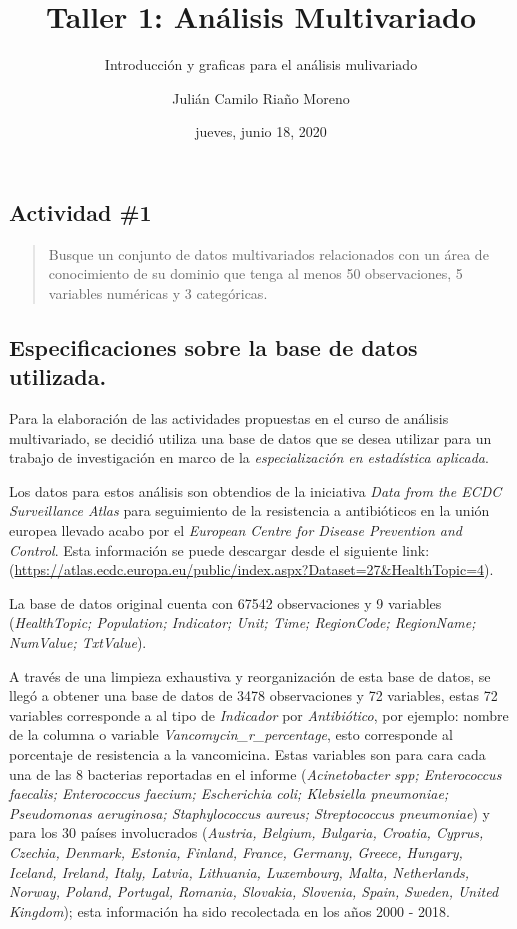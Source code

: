 \documentclass[
]{article}
\title{Taller 1: Análisis Multivariado}
\subtitle{Introducción y graficas para el análisis mulivariado}
\author{Julián Camilo Riaño Moreno}
\date{jueves, junio 18, 2020}
\begin{document}
\maketitle

{
\setcounter{tocdepth}{3}
\tableofcontents
}
\hypertarget{actividad-1}{%
\subsection{Actividad \#1}\label{actividad-1}}

\begin{quote}
Busque un conjunto de datos multivariados relacionados con un área de
conocimiento de su dominio que tenga al menos 50 observaciones, 5
variables numéricas y 3 categóricas.
\end{quote}

\hypertarget{especificaciones-sobre-la-base-de-datos-utilizada.}{%
\subsection{Especificaciones sobre la base de datos
utilizada.}\label{especificaciones-sobre-la-base-de-datos-utilizada.}}

Para la elaboración de las actividades propuestas en el curso de
análisis multivariado, se decidió utiliza una base de datos que se desea
utilizar para un trabajo de investigación en marco de la
\emph{especialización en estadística aplicada}.

Los datos para estos análisis son obtendios de la iniciativa \emph{Data
from the ECDC Surveillance Atlas} para seguimiento de la resistencia a
antibióticos en la unión europea llevado acabo por el \emph{European
Centre for Disease Prevention and Control}. Esta información se puede
descargar desde el siguiente link:
(\url{https://atlas.ecdc.europa.eu/public/index.aspx?Dataset=27\&HealthTopic=4}).

La base de datos original cuenta con 67542 observaciones y 9 variables
(\emph{HealthTopic; Population; Indicator; Unit; Time; RegionCode;
RegionName; NumValue; TxtValue}).

A través de una limpieza exhaustiva y reorganización de esta base de
datos, se llegó a obtener una base de datos de 3478 observaciones y 72
variables, estas 72 variables corresponde a al tipo de \emph{Indicador}
por \emph{Antibiótico}, por ejemplo: nombre de la columna o variable
\emph{Vancomycin\_r\_percentage}, esto corresponde al porcentaje de
resistencia a la vancomicina. Estas variables son para cara cada una de
las 8 bacterias reportadas en el informe (\emph{Acinetobacter spp;
Enterococcus faecalis; Enterococcus faecium; Escherichia coli;
Klebsiella pneumoniae; Pseudomonas aeruginosa; Staphylococcus aureus;
Streptococcus pneumoniae}) y para los 30 países involucrados
(\emph{Austria, Belgium, Bulgaria, Croatia, Cyprus, Czechia, Denmark,
Estonia, Finland, France, Germany, Greece, Hungary, Iceland, Ireland,
Italy, Latvia, Lithuania, Luxembourg, Malta, Netherlands, Norway,
Poland, Portugal, Romania, Slovakia, Slovenia, Spain, Sweden, United
Kingdom}); esta información ha sido recolectada en los años 2000 - 2018.
\end{document}
